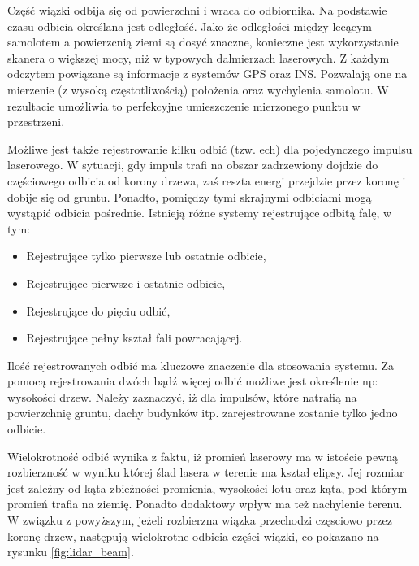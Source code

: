 Część wiązki odbija się od powierzchni i wraca do odbiornika. Na podstawie czasu odbicia określana jest odległość. Jako że odległości między
lecącym samolotem a powierzcnią ziemi są dosyć znaczne, konieczne jest wykorzystanie skanera o większej mocy, niż w typowych dalmierzach laserowych.
Z każdym odczytem powiązane są informacje z systemów GPS oraz INS. Pozwalają one na mierzenie (z wysoką częstotliwością) położenia oraz wychylenia samolotu.
W rezultacie umożliwia to perfekcyjne umieszczenie mierzonego punktu w przestrzeni.

Możliwe jest także rejestrowanie kilku odbić (tzw. ech) dla pojedynczego impulsu laserowego. W sytuacji, gdy impuls trafi na obszar zadrzewiony dojdzie do częściowego odbicia
od korony drzewa, zaś reszta energi przejdzie przez koronę i dobije się od gruntu. Ponadto, pomiędzy tymi skrajnymi odbiciami mogą wystąpić odbicia pośrednie.
Istnieją różne systemy rejestrujące odbitą falę, w tym:
\begin{itemize}
    \item Rejestrujące tylko pierwsze lub ostatnie odbicie,
    \item Rejestrujące pierwsze i ostatnie odbicie,
    \item Rejestrujące do pięciu odbić,
    \item Rejestrujące pełny kształ fali powracającej.
\end{itemize}

Ilość rejestrowanych odbić ma kluczowe znaczenie dla stosowania systemu. Za pomocą rejestrowania dwóch bądź więcej odbić możliwe jest określenie np:
wysokości drzew. Należy zaznaczyć, iż dla impulsów, które natrafią na powierzchnię gruntu, dachy budynków itp. zarejestrowane zostanie tylko jedno
odbicie.

Wielokrotność odbić wynika z faktu, iż promień laserowy ma w istoście pewną rozbierzność w wyniku której ślad lasera w terenie ma kształ elipsy.
Jej rozmiar jest zależny od kąta zbieżności promienia, wysokości lotu oraz kąta, pod którym promień trafia na ziemię. Ponadto dodaktowy wpływ ma
też nachylenie terenu. W związku z powyższym, jeżeli rozbierzna wiązka przechodzi częsciowo przez koronę drzew, następują wielokrotne odbicia części wiązki,
co pokazano na rysunku \ref{fig:lidar_beam}.


